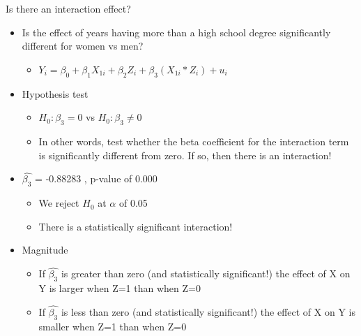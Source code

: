 \documentclass[8pt,ignorenonframetext,dvipsnames]{beamer}
\providecommand{\tightlist}{%
  \setlength{\itemsep}{0pt}\setlength{\parskip}{0pt}}
\let\olditem\item
\renewcommand{\item}{%
  \olditem\vspace{4pt}
}
\begin{document}
\begin{frame}{Is there an interaction effect?}
\protect\hypertarget{is-there-an-interaction-effect}{}

\begin{itemize}
\tightlist
\item
  Is the effect of years having more than a high school degree
  significantly different for women vs men?

  \begin{itemize}
  \tightlist
  \item
    \(Y_i = \beta_0 + \beta_1X_{1i} + \beta_2Z_{i} + \beta_3(X_{1i}*Z_{i}) + u_i\)
  \end{itemize}
\item
  Hypothesis test

  \begin{itemize}
  \tightlist
  \item
    \(H_0: \beta_3 =0\) vs \(H_0: \beta_3 \ne 0\)
  \item
    In other words, test whether the beta coefficient for the
    interaction term is significantly different from zero. If so, then
    there is an interaction!
  \end{itemize}
\item
  \(\hat{\beta_3}\) = -0.88283 , p-value of 0.000

  \begin{itemize}
  \tightlist
  \item
    We reject \(H_0\) at \(\alpha\) of 0.05
  \item
    There is a statistically significant interaction!
  \end{itemize}
\item
  Magnitude

  \begin{itemize}
  \tightlist
  \item
    If \(\hat{\beta_3}\) is greater than zero (and statistically
    significant!) the effect of X on Y is larger when Z=1 than when Z=0
  \item
    If \(\hat{\beta_3}\) is less than zero (and statistically
    significant!) the effect of X on Y is smaller when Z=1 than when Z=0
  \end{itemize}
\end{itemize}

\end{frame}
\end{document}
